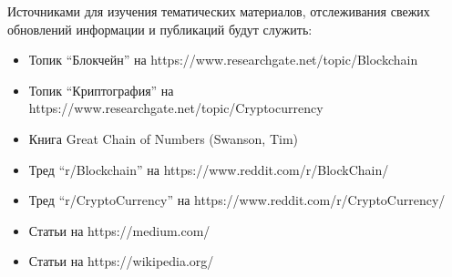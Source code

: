 Источниками для изучения тематических материалов, отслеживания свежих обновлений информации и публикаций будут служить:

\begin{itemize}
    \item Топик ``Блокчейн'' на https://www.researchgate.net/topic/Blockchain
    \item Топик ``Криптография'' на https://www.researchgate.net/topic/Cryptocurrency
    \item Книга Great Chain of Numbers (Swanson, Tim) \cite{TimSwanson2014}
    \item Тред ``r/Blockchain'' на https://www.reddit.com/r/BlockChain/
    \item Тред ``r/CryptoCurrency'' на https://www.reddit.com/r/CryptoCurrency/
    \item Статьи на https://medium.com/
    \item Статьи на https://wikipedia.org/
\end{itemize}

